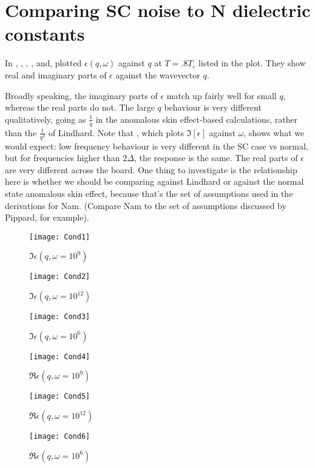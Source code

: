 \documentclass[11pt]{article}
\begin{document}
	\graphicspath{{figures/}}

	\section{Comparing SC noise to N dielectric constants} \label{sec:intro}

	In , , , ,  and, plotted $\epsilon(q, \omega)$ against $q$ at $T = .8 T_c$ listed in the plot.
	They show real and imaginary parts of $\epsilon$ against the wavevector $q$.

	Broadly speaking, the imaginary parts of $\epsilon$ match up fairly well for small $q$, whereas the real parts do not.
	The large $q$ behaviour is very different qualitatively, going as $\frac{1}{q}$ in the anomalous skin effect-based calculations, rather than the $\frac{1}{q^2}$ of Lindhard.
	Note that , which plots $\Im[\epsilon]$ against $\omega$, shows what we would expect: low frequency behaviour is very different in the SC case vs normal, but for frequencies higher than $2 \Delta$, the response is the same.
	The real parts of $\epsilon$ are very different across the board.
	One thing to investigate is the relationship here is whether we should be comparing against Lindhard or against the normal state anomalous skin effect, because that's the set of assumptions used in the derivations for Nam.
	(Compare Nam\autocite{Nam1967} to the set of assumptions discussed by Pippard\autocite{Pippard}, for example).
	\begin{figure}[htp]
		\centering
		\texttt{[image: Cond1]}
		\caption{$\Im \epsilon(q, \omega = 10^9)$} \label{fig:1}
	\end{figure}
	\begin{figure}[htp]
		\centering
		\texttt{[image: Cond2]}
		\caption{$\Im \epsilon(q, \omega = 10^{12})$} \label{fig:2}
	\end{figure}
	\begin{figure}[htp]
		\centering
		\texttt{[image: Cond3]}
		\caption{$\Im \epsilon(q, \omega = 10^6)$} \label{fig:3}
	\end{figure}
	\begin{figure}[htp]
		\centering
		\texttt{[image: Cond4]}
		\caption{$\Re \epsilon(q, \omega = 10^9)$} \label{fig:4}
	\end{figure}
	\begin{figure}[htp]
		\centering
		\texttt{[image: Cond5]}
		\caption{$\Re \epsilon(q, \omega = 10^{12})$} \label{fig:5}
	\end{figure}
	\begin{figure}[htp]
		\centering
		\texttt{[image: Cond6]}
		\caption{$\Re \epsilon(q, \omega = 10^6)$} \label{fig:6}
	\end{figure}
\end{document}
